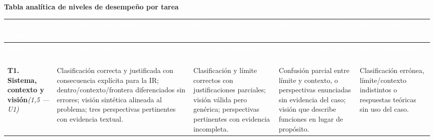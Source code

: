 \documentclass[11pt]{article}
\renewcommand{\arraystretch}{1.25}
\begin{document}
\begin{landscape}
\thispagestyle{fancy}
\begin{center}
{\large\textbf{\textcolor{utegreendk}{Tabla analítica de niveles de desempeño por tarea}}}
\end{center}
\vspace{2pt}
{\footnotesize
\renewcommand{\arraystretch}{1.18}
\setlength{\tabcolsep}{4pt}

\begin{longtable}{|L{3.2cm}|L{5.6cm}|L{5.3cm}|L{4.9cm}|L{4.3cm}|}
\hline
{}
\textcolor{white}{\textbf{Tarea (peso)}} &
\textcolor{white}{\textbf{N4 — Excelente (100\%)}} &
\textcolor{white}{\textbf{N3 — Satisfactorio (75\%)}} &
\textcolor{white}{\textbf{N2 — En desarrollo (50\%)}} &
\textcolor{white}{\textbf{N1 — Insuficiente (25\%)}} \\
\hline
\endfirsthead
\hline
{}
\textcolor{white}{\textbf{Tarea (peso)}} &
\textcolor{white}{\textbf{N4 — Excelente}} &
\textcolor{white}{\textbf{N3 — Satisfactorio}} &
\textcolor{white}{\textbf{N2 — En desarrollo}} &
\textcolor{white}{\textbf{N1 — Insuficiente}} \\
\hline
\endhead

\textbf{T1. Sistema, contexto y visión}\newline\textit{(1{,}5 — U1)} &
Clasificación correcta y justificada con consecuencia explícita para la IR; dentro/contexto/frontera diferenciados sin errores; visión sintética alineada al problema; tres perspectivas pertinentes con evidencia textual. &
Clasificación y límite correctos con justificaciones parciales; visión válida pero genérica; perspectivas pertinentes con evidencia incompleta. &
Confusión parcial entre límite y contexto, o perspectivas enunciadas sin evidencia del caso; visión que describe funciones en lugar de propósito. &
Clasificación errónea, límite/contexto indistintos o respuestas teóricas sin uso del caso. \\
\hline


\end{longtable}}
\end{landscape}
\end{document}
